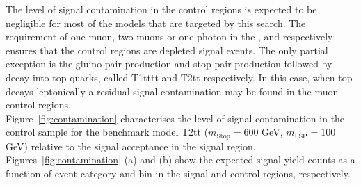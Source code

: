 The level of signal contamination in the control regions is expected to be negligible 
for most of the models that are targeted by this search. 
The requirement of one muon, two muons or one photon in the \mj, \mmj and \gj respectively 
ensures that the control regions are depleted signal events. 
The only partial exception is the gluino pair production and stop pair production followed by decay into top quarks, 
called T1tttt and T2tt respectively. 
In this case, when top decays leptonically a residual signal contamination may be found in the muon control regions. \\

Figure~\ref{fig:contamination} characterises the level of signal
contamination in the \mj control sample for the benchmark model
T2tt ($m_{\mathrm{Stop}}=600$ GeV, $m_{\mathrm{LSP}}=100$ GeV) relative to the signal acceptance in the
signal region. Figures~\ref{fig:contamination} (a) and (b) show the
expected signal yield counts as a function of event category and
\scalht bin in the signal and \mj control regions, respectively.

